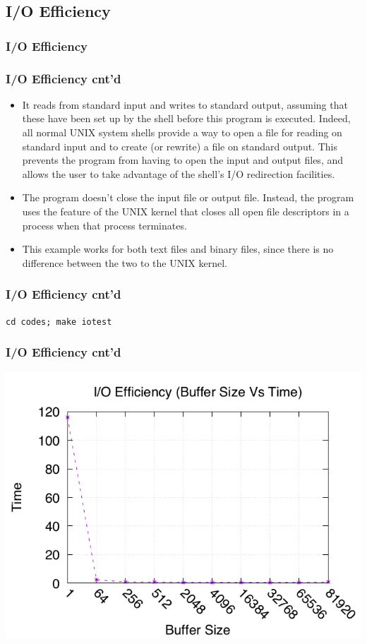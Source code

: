 \documentclass[newPxFont,sthlmFooter,nooffset]{beamer}
\begin{document}
\subsection{I/O Efficiency}
\begin{frame}[containsverbatim,t]
  \frametitle{I/O Efficiency}

\end{frame}

\begin{frame}[containsverbatim,t]
  \frametitle{I/O Efficiency cnt'd}
\begin{itemize}
\item  It reads from standard input and writes to standard output, assuming that these have been set up by the shell before this program is executed. Indeed, all normal UNIX system shells provide a way to open a file for reading on standard input and to create (or rewrite) a file on standard output. This prevents the program from having to open the input and output files, and allows the user to take advantage of the shell’s I/O redirection facilities.
\item The program doesn’t close the input file or output file. Instead, the program uses the feature of the UNIX kernel that closes all open file descriptors in a process when that process terminates.
\item This example works for both text files and binary files, since there is no difference between the two to the UNIX kernel.
\end{itemize}
\end{frame}


\begin{frame}[containsverbatim,t]
  \frametitle{I/O Efficiency cnt'd}
\texttt{cd codes; make iotest}
\bigskip


\end{frame}


\begin{frame}[t]
  \frametitle{I/O Efficiency cnt'd}
\centering
\includegraphics[width=0.85\linewidth]{./figure/iotest.png}
\end{frame}
\end{document}
